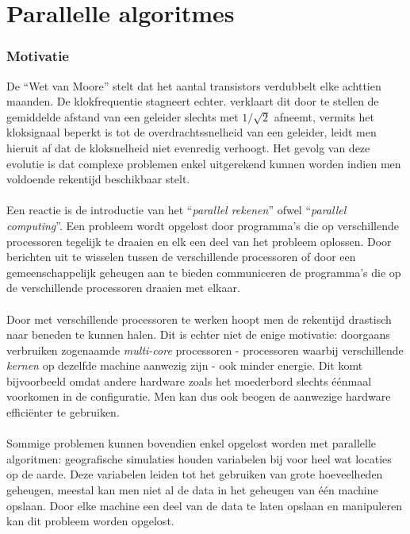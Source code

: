 \section{Parallelle algoritmes}

\subsubsection{Motivatie}

De ``Wet van Moore''\cite{4785860} stelt dat het aantal transistors verdubbelt elke achttien maanden. De klokfrequentie stagneert echter. \cite{nomoore} verklaart dit door te stellen de gemiddelde afstand van een geleider slechts met $1/\sqrt{2}$ afneemt, vermits het kloksignaal beperkt is tot de overdrachtssnelheid van een geleider, leidt men hieruit af dat de kloksnelheid niet evenredig verhoogt. Het gevolg van deze evolutie is dat complexe problemen enkel uitgerekend kunnen worden indien men voldoende rekentijd beschikbaar stelt.
\paragraph{}
Een reactie is de introductie van het ``\emph{parallel rekenen}'' ofwel ``\emph{parallel computing}''. Een probleem wordt opgelost door programma's die op verschillende processoren tegelijk te draaien en elk een deel van het probleem oplossen. Door berichten uit te wisselen tussen de verschillende processoren of door een gemeenschappelijk geheugen aan te bieden communiceren de programma's die op de verschillende processoren draaien met elkaar.\cite{books/bc/KumarGGK94}

\paragraph{}
Door met verschillende processoren te werken hoopt men de rekentijd drastisch naar beneden te kunnen halen. Dit is echter niet de enige motivatie: doorgaans verbruiken zogenaamde \emph{multi-core} processoren - processoren waarbij verschillende \emph{kernen} op dezelfde machine aanwezig zijn - ook minder energie. Dit komt bijvoorbeeld omdat andere hardware zoals het moederbord slechts \'e\'enmaal voorkomen in de configuratie. Men kan dus ook beogen de aanwezige hardware effici\"enter te gebruiken.\cite{Korthikanti:2009:APA:1678990.1679696,parenergy}

\paragraph{}
Sommige problemen kunnen bovendien enkel opgelost worden met parallelle algoritmen: geografische simulaties houden variabelen bij voor heel wat locaties op de aarde. Deze variabelen leiden tot het gebruiken van grote hoeveelheden geheugen, meestal kan men niet al de data in het geheugen van \'e\'en machine opslaan. Door elke machine een deel van de data te laten opslaan en manipuleren kan dit probleem worden opgelost.\cite{journals/pc/HawickCJ03}

